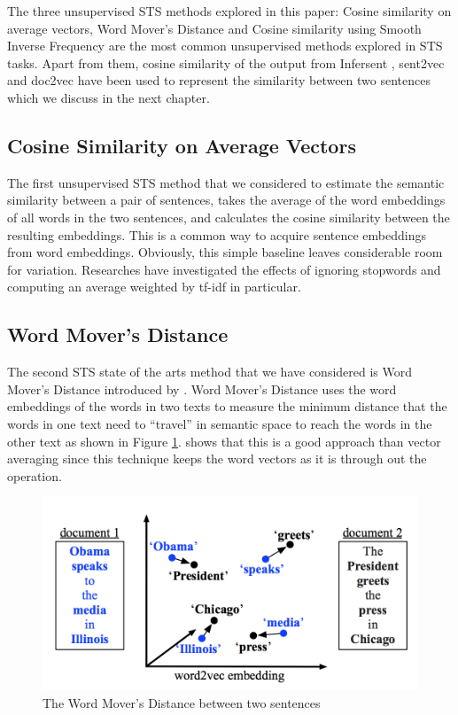 The three unsupervised STS methods explored in this paper: Cosine similarity on average vectors, Word Mover's Distance and Cosine similarity using Smooth Inverse Frequency are the most common unsupervised methods explored in STS tasks. Apart from them, cosine similarity of the output from Infersent \cite{conneau-EtAl:2017:EMNLP2017}, sent2vec \cite{pagliardini-etal-2018-unsupervised} and doc2vec \cite{10.5555/3044805.3045025} have been used to represent the similarity between two sentences which we discuss in the next chapter. 


\subsection{Cosine Similarity on Average Vectors}
The first unsupervised STS method that we considered to estimate the semantic similarity between a pair of sentences, takes the average of the word embeddings of all words in the two sentences, and calculates the cosine similarity between the resulting embeddings. This is a common way to acquire sentence embeddings from word embeddings. Obviously, this simple baseline leaves considerable room for variation. Researches have investigated the effects of ignoring stopwords and computing an average weighted by tf-idf in particular.

\subsection{Word Mover's Distance}
The second STS state of the arts method that we have considered is Word Mover's Distance introduced by \citet{10.5555/3045118.3045221}. Word Mover's Distance uses the word embeddings of the words in two texts to measure the minimum distance that the words in one text need to ``travel'' in semantic space to reach the words in the other text as shown in Figure \ref{fig:WMD}. \citet{10.5555/3045118.3045221} shows that this is a good approach than vector averaging since this technique keeps the word vectors as it is through out the operation.

\begin{figure}[ht]
	\centering
	\includegraphics[scale=0.4]{figures/semantic_textual_similarity/state_of_the_art/word_movers_distance.png}
	\caption{The Word Mover's Distance between two sentences}
	\label{fig:WMD}
\end{figure}

